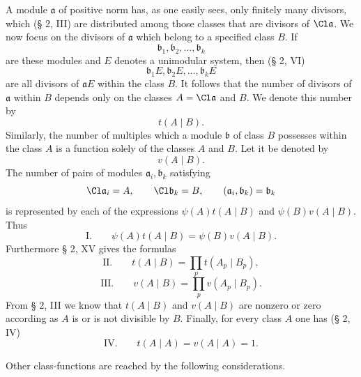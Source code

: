 A module $\mathfrak a$ of positive norm has, as one easily sees, only finitely many divisors, which (§ 2, III) are distributed among those classes that are divisors of $\Cl\mathfrak a$. We now focus on the divisors of $\mathfrak a$ which belong to a specified class $B$. If
\[
 \mathfrak b_1,\mathfrak b_2,\ldots,\mathfrak b_k
\]
are these modules and $E$ denotes a unimodular system, then (§ 2, VI)
\[
 \mathfrak b_1E,\mathfrak b_2E,\ldots,\mathfrak b_kE
\]
are all divisors of $\mathfrak aE$ within the class $B$. It follows that the number of divisors of $\mathfrak a$ within $B$ depends only on the classes $A=\Cl\mathfrak a$ and $B$. We denote this number by
\[
 t(A\mid B).
\]
Similarly, the number of multiples which a module $\mathfrak b$ of class $B$ possesses within the class $A$ is a function solely of the classes $A$ and $B$. Let it be denoted by
\[
 v(A\mid B).
\]
The number of pairs of modules $\mathfrak a_i,\mathfrak b_k$ satisfying
\[
 \Cl\mathfrak a_i=A,
 \qquad
 \Cl\mathfrak b_k=B,
 \qquad
 (\mathfrak a_i,\mathfrak b_k)=\mathfrak b_k
\]
is represented by each of the expressions $\psi(A)t(A\mid B)$ and $\psi(B)v(A\mid B)$. Thus
\[
\text{I.}\qquad
 \psi(A)t(A\mid B)=\psi(B)v(A\mid B).
\]
Furthermore § 2, XV gives the formulas
\[
\text{II.}\qquad t(A\mid B)=\prod_p t(A_p\mid B_p),
\]
\[
\text{III.}\qquad v(A\mid B)=\prod_p v(A_p\mid B_p).
\]
From § 2, III we know that $t(A\mid B)$ and $v(A\mid B)$ are nonzero or zero according as $A$ is or is not divisible by $B$. Finally, for every class $A$ one has (§ 2, IV)
\[
\text{IV.}\qquad t(A\mid A)=v(A\mid A)=1.
\]

Other class-functions are reached by the following considerations.

